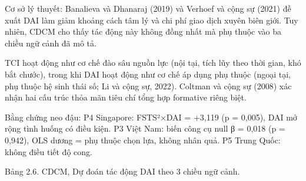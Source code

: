 \documentclass[
  a4paper,
  13pt]{extreport}
\begin{document}
Cơ sở lý thuyết: Banalieva và Dhanaraj (2019) và Verhoef và cộng sự
(2021) đề xuất DAI làm giảm khoảng cách tâm lý và chi phí giao dịch
xuyên biên giới. Tuy nhiên, CDCM cho thấy tác động này không đồng nhất
mà phụ thuộc vào ba chiều ngữ cảnh đã mô tả.

TCI hoạt động như cơ chế đào sâu nguồn lực (nội tại, tích lũy theo thời
gian, khó bắt chước), trong khi DAI hoạt động như cơ chế áp dụng phụ
thuộc (ngoại tại, phụ thuộc hệ sinh thái số; Li và cộng sự, 2022).
Coltman và cộng sự (2008) xác nhận hai cấu trúc thỏa mãn tiêu chí tổng
hợp formative riêng biệt.

Bằng chứng neo đậu: P4 Singapore: FSTS²×DAI = +3,119 (p = 0,005), DAI mở
rộng tình huống có điều kiện. P3 Việt Nam: biến công cụ null β = 0,018
(p = 0,942), OLS dương = phụ thuộc chọn lựa, không nhân quả. P5 Trung
Quốc: không điều tiết độ cong.

Bảng 2.6. CDCM, Dự đoán tác động DAI theo 3 chiều ngữ cảnh.
\end{document}
